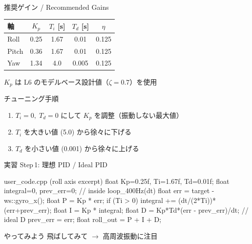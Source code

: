 \begin{frame}{推奨ゲイン / Recommended Gains}
  \begin{table}
    \centering
    \begin{tabular}{lcccc}
      \hline
      \textbf{軸} & \textbf{$K_p$} & \textbf{$T_i$ [s]} & \textbf{$T_d$ [s]} & \textbf{$\eta$} \\
      \hline
      Roll  & 0.25 & 1.67 & 0.01  & 0.125 \\
      Pitch & 0.36 & 1.67 & 0.01  & 0.125 \\
      Yaw   & 1.34 & 4.0  & 0.005 & 0.125 \\
      \hline
    \end{tabular}
  \end{table}

  \vspace{0.3em}

  {\small $K_p$ は L6 のモデルベース設計値（$\zeta = 0.7$）を使用}

  \vspace{0.3em}

  \begin{block}{チューニング手順}
    \begin{enumerate}
      \item $T_i{=}0,\; T_d{=}0$ にして $K_p$ を調整（振動しない最大値）
      \item $T_i$ を大きい値 (5.0) から徐々に下げる
      \item $T_d$ を小さい値 (0.001) から徐々に上げる
    \end{enumerate}
  \end{block}
\end{frame}

\begin{frame}[fragile]{実習 Step\,1: 理想 PID / Ideal PID}
  \begin{sflisting}[basicstyle=\ttfamily\scriptsize]{user\_code.cpp (roll axis excerpt)}
float Kp=0.25f, Ti=1.67f, Td=0.01f;
float integral=0, prev_err=0;
// inside loop_400Hz(dt)
float err = target - ws::gyro_x();
float P = Kp * err;
if (Ti > 0) integral += (dt/(2*Ti))*(err+prev_err);
float I = Kp * integral;
float D = Kp*Td*(err - prev_err)/dt; // ideal D
prev_err = err;
float roll_out = P + I + D;
  \end{sflisting}
  \begin{exampleblock}{やってみよう}
    飛ばしてみて $\to$ 高周波振動に注目
  \end{exampleblock}
\end{frame}

